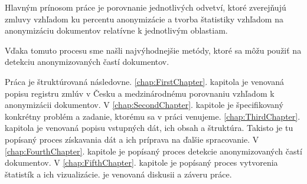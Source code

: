 Hlavným prínosom práce je porovnanie jednotlivých odvetví, ktoré zverejňujú zmluvy vzhľadom ku percentu anonymizácie a
tvorba štatistiky vzhľadom na anonymizáciu dokumentov relatívne k jednotlivým oblastiam. 

Vďaka tomuto procesu sme našli najvýhodnejšie metódy, ktoré sa môžu použiť na detekciu anonymizovaných častí dokumentov.
\newline

Práca je štruktúrovaná následovne. \ref{chap:FirstChapter}. kapitola je venovaná popisu registru zmlúv
v Česku a medzinárodnému porovnaniu vzhľadom k anonymizácii dokumentov. V \ref{chap:SecondChapter}. kapitole
je špecifikovaný konkrétny problém a zadanie, ktorému sa v práci venujeme. \ref{chap:ThirdChapter}. kapitola
je venovaná popisu vstupných dát, ich obsah a štruktúra. Takisto je tu popísaný proces získavania dát a ich
príprava na ďalšie spracovanie. V \ref{chap:FourthChapter}. kapitole je popísaný proces detekcie anonymizovaných
častí dokumentov. V \ref{chap:FifthChapter}. kapitole je popísaný proces vytvorenia štatistík a ich vizualizácie.
 je venovaná diskusii a záveru práce.



